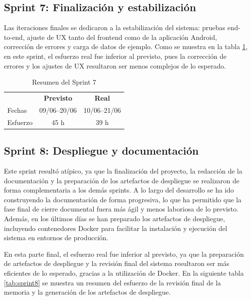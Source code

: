 \subsection{Sprint 7: Finalización y estabilización}
Las iteraciones finales se dedicaron a la estabilización del sistema: pruebas end-to-end, ajuste de UX tanto del frontend como de la aplicación Android, corrección de errores y carga de datos de ejemplo. Como se muestra en la tabla \ref{tab:sprint7}, en este sprint, el esfuerzo real fue inferior al previsto, pues la corrección de errores y los ajustes de UX resultaron ser menos complejos de lo esperado.

\begin{table}[H]
  \centering
  \begin{tabular}{l|c|c}
    \rowcolor{udcpink!25}
    \textbf{} & \textbf{Previsto} & \textbf{Real} \\
    Fechas & 09/06--20/06 & 10/06--21/06 \\
    Esfuerzo & 45 h & 39 h \\
  \end{tabular}
  \caption{Resumen del Sprint 7}
  \label{tab:sprint7}
\end{table}

\subsection{Sprint 8: Despliegue y documentación}

Este sprint resultó atípico, ya que la finalización del proyecto, la redacción de la documentación y la preparación de los artefactos de despliegue se realizaron de forma complementaria a los demás sprints. A lo largo del desarrollo se ha ido construyendo la documentación de forma progresiva, lo que ha permitido que la fase final de cierre documental fuera más ágil y menos laboriosa de lo previsto. Además, en los últimos días se han preparado los artefactos de despliegue, incluyendo contenedores Docker para facilitar la instalación y ejecución del sistema en entornos de producción.

En esta parte final, el esfuerzo real fue inferior al previsto, ya que la preparación de artefactos de despliegue y la revisión final del sistema resultaron ser más eficientes de lo esperado, gracias a la utilización de Docker. 
En la siguiente tabla \ref{tab:sprint8} se muestra un resumen del esfuerzo de la revisión final de la memoria y la generación de los artefactos de despliegue.

